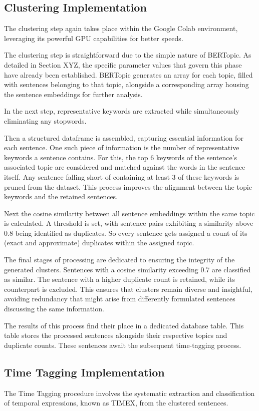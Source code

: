\documentclass[a4paper,10pt]{report} %
\begin{document}
\subsection{Clustering Implementation}
The clustering step again takes place within the Google Colab environment, leveraging its powerful GPU capabilities for better speeds.

The clustering step is straightforward due to the simple nature of BERTopic. As detailed in Section XYZ, the specific parameter values that govern this phase have already been established. BERTopic generates an array for each topic, filled with sentences belonging to that topic, alongside a corresponding array housing the sentence embeddings for further analysis.

In the next step, representative keywords are extracted while simultaneously eliminating any stopwords.

Then a structured dataframe is assembled, capturing essential information for each sentence. One such piece of information is the number of representative keywords a sentence contains. For this, the top 6 keywords of the sentence's associated topic are considered and matched against the words in the sentence itself. Any sentence falling short of containing at least 3 of these keywords is pruned from the dataset. This process improves the alignment between the topic keywords and the retained sentences.

Next the cosine similarity between all sentence embeddings within the same topic is calculated. A threshold is set, with sentence pairs exhibiting a similarity above 0.8 being identified as duplicates. So every sentence gets assigned a count of its (exact and approximate) duplicates within the assigned topic.

The final stages of processing are dedicated to ensuring the integrity of the generated clusters. Sentences with a cosine similarity exceeding 0.7 are classified as similar. The sentence with a higher duplicate count is retained, while its counterpart is excluded. This ensures that clusters remain diverse and insightful, avoiding redundancy that might arise from differently formulated sentences discussing the same information.

The results of this process find their place in a dedicated database table. This table stores the processed sentences alongside their respective topics and duplicate counts. These sentences await the subsequent time-tagging process.

\subsection{Time Tagging Implementation}
The Time Tagging procedure involves the systematic extraction and classification of temporal expressions, known as TIMEX, from the clustered sentences.
\end{document}
